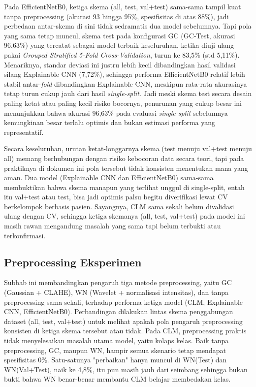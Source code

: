 Pada EfficientNetB0, ketiga skema (all, test, val+test) sama-sama tampil kuat tanpa preprocessing (akurasi 93 hingga 95\%, spesifisitas di atas 88\%), jadi perbedaan antar-skema di sini tidak sedramatis dua model sebelumnya. Tapi pola yang sama tetap muncul, skema test pada konfigurasi GC (GC-Test, akurasi 96,63\%) yang tercatat sebagai model terbaik keseluruhan, ketika diuji ulang pakai \textit{Grouped Stratified 5-Fold Cross-Validation}, turun ke 83,5\% (std 5,11\%). Menariknya, standar deviasi ini justru lebih kecil dibandingkan hasil validasi silang Explainable CNN (7,72\%), sehingga performa EfficientNetB0 relatif lebih stabil antar-\textit{fold} dibandingkan Explainable CNN, meskipun rata-rata akurasinya tetap turun cukup jauh dari hasil \textit{single-split}. Jadi meski skema test secara desain paling ketat atau paling kecil risiko bocornya, penurunan yang cukup besar ini menunjukkan bahwa akurasi 96,63\% pada evaluasi \textit{single-split} sebelumnya kemungkinan besar terlalu optimis dan bukan estimasi performa yang representatif.

Secara keseluruhan, urutan ketat-longgarnya skema (test menuju val+test menuju all) memang berhubungan dengan risiko kebocoran data secara teori, tapi pada praktiknya di dokumen ini pola tersebut tidak konsisten menentukan mana yang aman. Dua model (Explainable CNN dan EfficientNetB0) sama-sama membuktikan bahwa skema manapun yang terlihat unggul di single-split, entah itu val+test atau test, bisa jadi optimis palsu begitu diverifikasi lewat CV berkelompok berbasis pasien. Sayangnya, CLM sama sekali belum divalidasi ulang dengan CV, sehingga ketiga skemanya (all, test, val+test) pada model ini masih rawan mengandung masalah yang sama tapi belum terbukti atau terkonfirmasi.

\subsection{Preprocessing Eksperimen}
\label{subsec:preprocessing}
Subbab ini membandingkan pengaruh tiga metode preprocessing, yaitu GC (Gaussian + CLAHE), WN (Wavelet + normalisasi intensitas), dan tanpa preprocessing sama sekali, terhadap performa ketiga model (CLM, Explainable CNN, EfficientNetB0). Perbandingan dilakukan lintas skema penggabungan dataset (all, test, val+test) untuk melihat apakah pola pengaruh preprocessing konsisten di ketiga skema tersebut atau tidak.
Pada CLM, preprocessing praktis tidak menyelesaikan masalah utama model, yaitu kolaps kelas. Baik tanpa preprocessing, GC, maupun WN, hampir semua skenario tetap mendapat spesifisitas 0\%. Satu-satunya "perbaikan" hanya muncul di WN(Test) dan WN(Val+Test), naik ke 4,8\%, itu pun masih jauh dari seimbang sehingga bukan bukti bahwa WN benar-benar membantu CLM belajar membedakan kelas.

